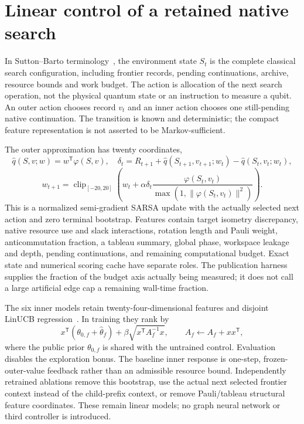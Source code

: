 \documentclass[11pt]{article}
\begin{document}
\section{Linear control of a retained native search}
In Sutton--Barto terminology~\cite{sutton}, the environment state $S_t$ is the complete classical search configuration, including frontier records, pending continuations, archive, resource bounds and work budget. The action is allocation of the next search operation, not the physical quantum state or an instruction to measure a qubit. An outer action chooses record $v_t$ and an inner action chooses one still-pending native continuation. The transition is known and deterministic; the compact feature representation is not asserted to be Markov-sufficient.

The outer approximation has twenty coordinates,
\begin{equation}
 \hat q(S,v;w)=w^\mathsf T\varphi(S,v),\quad
 \delta_t=R_{t+1}+\hat q(S_{t+1},v_{t+1};w_t)-\hat q(S_t,v_t;w_t),
\end{equation}
\begin{equation}
 w_{t+1}=\operatorname{clip}_{[-20,20]}
 \left(w_t+\alpha\delta_t\frac{\varphi(S_t,v_t)}{\max(1,\|\varphi(S_t,v_t)\|^2)}\right).
\end{equation}
This is a normalized semi-gradient SARSA update with the actually selected next action and zero terminal bootstrap. Features contain target isometry discrepancy, native resource use and slack interactions, rotation length and Pauli weight, anticommutation fraction, a tableau summary, global phase, workspace leakage and depth, pending continuations, and remaining computational budget. Exact state and numerical scoring cache have separate roles. The publication harness supplies the fraction of the budget axis actually being measured; it does not call a large artificial edge cap a remaining wall-time fraction.

The six inner models retain twenty-four-dimensional features and disjoint LinUCB regression~\cite{li}. In training they rank by
\begin{equation}
 x^\mathsf T(\theta_{0,f}+\hat\theta_f)+
 \beta\sqrt{x^\mathsf TA_f^{-1}x},\qquad
 A_f\leftarrow A_f+xx^\mathsf T,
\end{equation}
where the public prior $\theta_{0,f}$ is shared with the untrained control. Evaluation disables the exploration bonus. The baseline inner response is one-step, frozen-outer-value feedback rather than an admissible resource bound. Independently retrained ablations remove this bootstrap, use the actual next selected frontier context instead of the child-prefix context, or remove Pauli/tableau structural feature coordinates. These remain linear models; no graph neural network or third controller is introduced.
\end{document}

